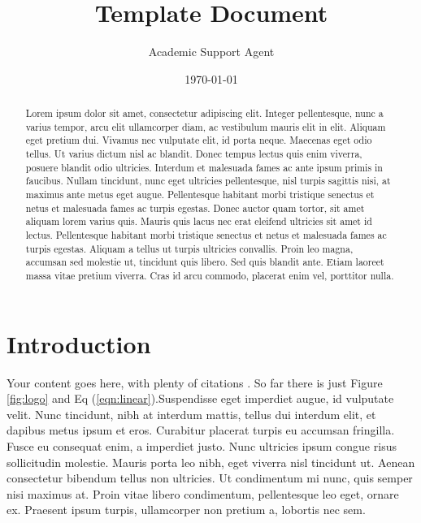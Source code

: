 \documentclass{article}
\title{Template Document}
\author{Academic Support Agent}
\date{\today}
\begin{document}
\maketitle

\begin{abstract}
        Lorem ipsum dolor sit amet, consectetur adipiscing elit. Integer pellentesque, nunc a varius tempor, arcu elit ullamcorper diam, ac vestibulum mauris elit in elit. Aliquam eget pretium dui. Vivamus nec vulputate elit, id porta neque. Maecenas eget odio tellus. Ut varius dictum nisl ac blandit. Donec tempus lectus quis enim viverra, posuere blandit odio ultricies. Interdum et malesuada fames ac ante ipsum primis in faucibus. Nullam tincidunt, nunc eget ultricies pellentesque, nisl turpis sagittis nisi, at maximus ante metus eget augue. Pellentesque habitant morbi tristique senectus et netus et malesuada fames ac turpis egestas. Donec auctor quam tortor, sit amet aliquam lorem varius quis. Mauris quis lacus nec erat eleifend ultricies sit amet id lectus. Pellentesque habitant morbi tristique senectus et netus et malesuada fames ac turpis egestas. Aliquam a tellus ut turpis ultricies convallis. Proin leo magna, accumsan sed molestie ut, tincidunt quis libero. Sed quis blandit ante. Etiam laoreet massa vitae pretium viverra. Cras id arcu commodo, placerat enim vel, porttitor nulla.
    \end{abstract}
    
    \maketitle

    \section{Introduction}

        Your content goes here, with plenty of citations \citep{sample}. So far there is just Figure \ref{fig:logo} and Eq (\ref{eqn:linear}).Suspendisse eget imperdiet augue, id vulputate velit. Nunc tincidunt, nibh at interdum mattis, tellus dui interdum elit, et dapibus metus ipsum et eros. Curabitur placerat turpis eu accumsan fringilla. Fusce eu consequat enim, a imperdiet justo. Nunc ultricies ipsum congue risus sollicitudin molestie. Mauris porta leo nibh, eget viverra nisl tincidunt ut. Aenean consectetur bibendum tellus non ultricies. Ut condimentum mi nunc, quis semper nisi maximus at. Proin vitae libero condimentum, pellentesque leo eget, ornare ex. Praesent ipsum turpis, ullamcorper non pretium a, lobortis nec sem.
\end{document}
